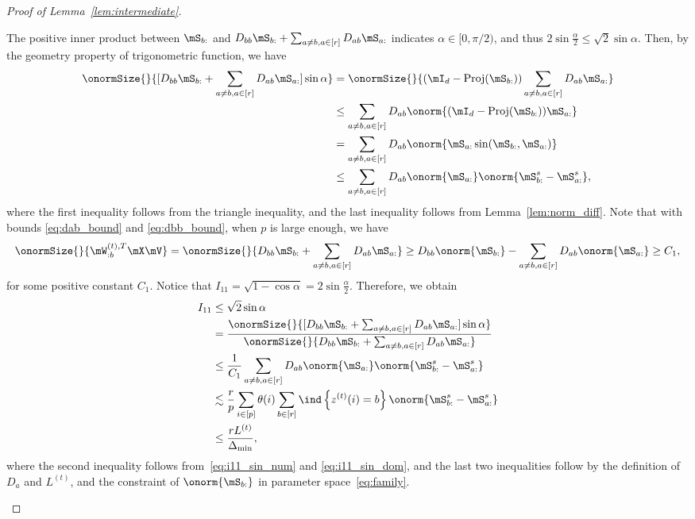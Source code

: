 \documentclass[lettersize,onecolumn,journal]{IEEEtran}
\theoremstyle{definition}
\theoremstyle{definition}
\newcommand{\offf}[1]{\left\{#1\right\}}
\begin{document}
\begin{proof}[Proof of Lemma~\ref{lem:intermediate}]
\begin{enumerate}[wide]
    The positive inner product between $\mS_{b:}$ and $D_{bb} \mS_{b:} + \sum_{a \neq b, a \in [r]} D_{ab} \mS_{a:}$ indicates $\alpha \in [0,  \pi/2)$, and thus $2\sin \frac{\alpha}{2} \leq \sqrt{2} \sin \alpha$. Then, by the geometry property of trigonometric function, we have 
    \begin{align}
       \onormSize{}{ [D_{bb} \mS_{b:} + \sum_{a \neq b, a \in [r]} D_{ab} \mS_{a:}] \sin \alpha} &= \onormSize{}{(\mI_d - \text{Proj}(\mS_{b:})) \sum_{a \neq b, a \in [r]} D_{ab} \mS_{a:}}\\
       &\leq \sum_{a \neq b, a \in [r]} D_{ab} \onorm{(\mI_d - \text{Proj}(\mS_{b:}))\mS_{a:}  }\\
       &= \sum_{a \neq b, a \in [r]} D_{ab} \onorm{ \mS_{a:} \sin (\mS_{b:}, \mS_{a:}) }\\
       & \leq \sum_{a \neq b, a \in [r]} D_{ab} \onorm{\mS_{a:}} \onorm{ \mS^s_{b:} - \mS^s_{a:}}, \label{eq:i11_sin_num}
    \end{align}
    where the first inequality follows from the triangle inequality, and the last inequality follows from Lemma~\ref{lem:norm_diff}. Note that with bounds \eqref{eq:dab_bound} and \eqref{eq:dbb_bound}, when $p$ is large enough, we have 
    \begin{equation}\label{eq:i11_sin_dom}
           \onormSize{}{\mW_{:b}^{(t), T} \mX \mV } = \onormSize{}{ D_{bb} \mS_{b:} + \sum_{a \neq b, a \in [r]} D_{ab} \mS_{a:}}  \geq D_{bb} \onorm{\mS_{b:}} - \sum_{a \neq b, a \in [r]} D_{ab} \onorm{ \mS_{a:}} \geq C_1,
    \end{equation}
    for some positive constant $C_1$. Notice that $I_{11} = \sqrt{1 - \cos \alpha} = 2 \sin \frac{\alpha}{2}$. Therefore, we obtain
    \begin{align}
        I_{11} &\leq \sqrt{2} \sin \alpha \\
        & = \frac{  \onormSize{}{ [D_{bb} \mS_{b:} + \sum_{a \neq b, a \in [r]} D_{ab} \mS_{a:}] \sin \alpha}}{  \onormSize{}{ D_{bb} \mS_{b:} + \sum_{a \neq b, a \in [r]} D_{ab} \mS_{a:}} } \\
        & \leq \frac{ 1}{C_1}  \sum_{a \neq b, a \in [r]} D_{ab} \onorm{\mS_{a:}} \onorm{ \mS^s_{b:} - \mS^s_{a:}} \\
        & \lesssim \frac{r}{p} \sum_{i \in [p]} \theta(i) \sum_{b \in [r]} \ind\offf{z^{(t)}(i) = b} \onorm{ \mS^s_{b:} - \mS^s_{a:}}\\
        & \leq \frac{r L^{(t)}}{\Delta_{\min}},\label{eq:i11}
    \end{align}
    where the second inequality follows from~\eqref{eq:i11_sin_num} and \eqref{eq:i11_sin_dom}, and the last two inequalities follow by the definition of $D_a$ and $L^{(t)}$, and the constraint of $\onorm{\mS_{b:}}$ in parameter space~\eqref{eq:family}.
    

\end{enumerate}
\end{proof}
\end{document}
